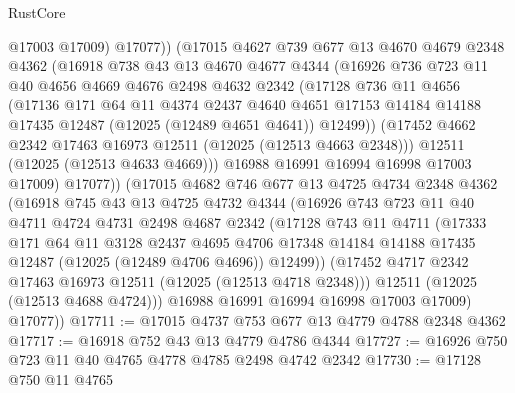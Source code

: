 \begin{lexlean}{RustCore}
\begin{coremodule}
              @17003
              @17009)
            @17077))
        (@17015
          @4627
          @739
          @677
          @13
          @4670
          @4679
          @2348
          @4362
          (@16918
            @738
            @43
            @13
            @4670
            @4677
            @4344
            (@16926
              @736
              @723
              @11
              @40
              @4656
              @4669
              @4676
              @2498
              @4632
              @2342
              (@17128
                @736
                @11
                @4656
                (@17136
                  @171
                  @64
                  @11
                  @4374
                  @2437
                  @4640
                  @4651
                  @17153
                  @14184
                  @14188
                  @17435
                  @12487
                  (@12025 (@12489 @4651 @4641))
                  @12499))
              (@17452 @4662 @2342 @17463 @16973 @12511 (@12025 (@12513 @4663 @2348)))
              @12511
              (@12025 (@12513 @4633 @4669)))
            @16988
            @16991
            @16994
            @16998
            @17003
            @17009)
          @17077))
      (@17015
        @4682
        @746
        @677
        @13
        @4725
        @4734
        @2348
        @4362
        (@16918
          @745
          @43
          @13
          @4725
          @4732
          @4344
          (@16926
            @743
            @723
            @11
            @40
            @4711
            @4724
            @4731
            @2498
            @4687
            @2342
            (@17128
              @743
              @11
              @4711
              (@17333
                @171
                @64
                @11
                @3128
                @2437
                @4695
                @4706
                @17348
                @14184
                @14188
                @17435
                @12487
                (@12025 (@12489 @4706 @4696))
                @12499))
            (@17452 @4717 @2342 @17463 @16973 @12511 (@12025 (@12513 @4718 @2348)))
            @12511
            (@12025 (@12513 @4688 @4724)))
          @16988
          @16991
          @16994
          @16998
          @17003
          @17009)
        @17077))
@17711 := @17015 @4737 @753 @677 @13 @4779 @4788 @2348 @4362
@17717 := @16918 @752 @43 @13 @4779 @4786 @4344
@17727 := @16926 @750 @723 @11 @40 @4765 @4778 @4785 @2498 @4742 @2342
@17730 := @17128 @750 @11 @4765

\end{coremodule}
\end{lexlean}
